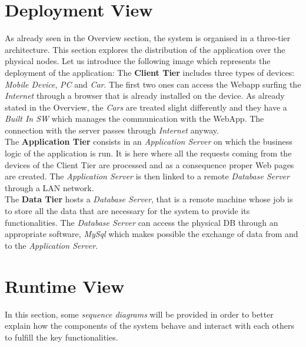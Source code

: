 \documentclass[11pt,a4paper]{report}
\begin{document}
\section{Deployment View}
As already seen in the Overview section, the system is organised in a three-tier architecture. This section explores the distribution of the application over the physical nodes. Let us introduce the following image which represents the deployment of the application:
\noindent The \textbf{Client Tier} includes three types of devices: \textit{Mobile Device}, \textit{PC} and \textit{Car}. The first two ones can access the Webapp surfing the \textit{Internet} through a browser that is already installed on the device.
As already stated in the Overview, the \textit{Cars} are treated slight differently and they have a \textit{Built In SW} which manages the communication with the WebApp. The connection with the server passes through \textit{Internet} anyway.\\
The \textbf{Application Tier} consists in an \textit{Application Server} on which the business logic of the application is run. It is here where all the requests coming from the devices of the Client Tier
are processed and as a consequence proper Web pages are created. The \textit{Application Server} is then linked to a remote \textit{Database Server} through a LAN network.\\
The \textbf{Data Tier} hosts a \textit{Database Server}, that is a remote machine whose job is to store all the data that are necessary for the system to provide its functionalities. The \textit{Database Server} can access the physical DB through an appropriate software, \textit{MySql} which makes possible the exchange of data from and to the \textit{Application Server}.

\section{Runtime View}
In this section, some \textit{sequence diagrams} will be provided in order to better explain how the components of the system behave and interact with each others to fulfill the key functionalities.
\end{document}
